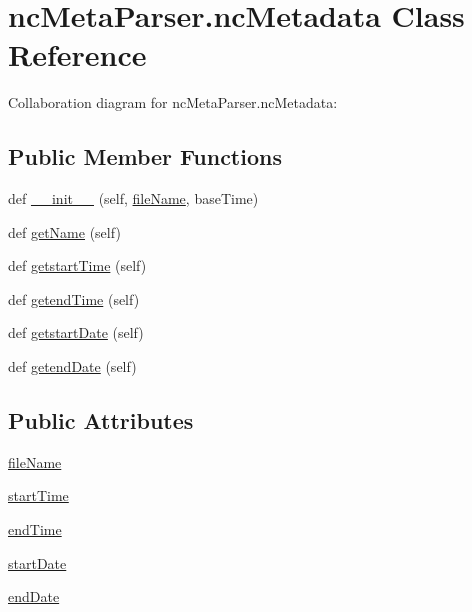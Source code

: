 \hypertarget{classnc_meta_parser_1_1nc_metadata}{}\section{nc\+Meta\+Parser.\+nc\+Metadata Class Reference}
\label{classnc_meta_parser_1_1nc_metadata}


Collaboration diagram for nc\+Meta\+Parser.\+nc\+Metadata\+:
\subsection*{Public Member Functions}
\begin{DoxyCompactItemize}
\item 
def \mbox{\hyperlink{classnc_meta_parser_1_1nc_metadata_aa36a1deb53cfbaee8976287877fa20fb}{\+\_\+\+\_\+init\+\_\+\+\_\+}} (self, \mbox{\hyperlink{classnc_meta_parser_1_1nc_metadata_a119acc5dbb77f035d27533b6fbe4a8c1}{file\+Name}}, base\+Time)
\item 
def \mbox{\hyperlink{classnc_meta_parser_1_1nc_metadata_ac262e3bca9dc97d7d55056a1931e6d1e}{get\+Name}} (self)
\item 
def \mbox{\hyperlink{classnc_meta_parser_1_1nc_metadata_afe2e767476347158c9359cc8c5afef21}{getstart\+Time}} (self)
\item 
def \mbox{\hyperlink{classnc_meta_parser_1_1nc_metadata_ad41081000ceb1f7aa122d5e4a1b674e4}{getend\+Time}} (self)
\item 
def \mbox{\hyperlink{classnc_meta_parser_1_1nc_metadata_a79b7ca324dcadb2f56066db1c663794a}{getstart\+Date}} (self)
\item 
def \mbox{\hyperlink{classnc_meta_parser_1_1nc_metadata_aea9c594ebe892b650ef724bdb73820e4}{getend\+Date}} (self)
\end{DoxyCompactItemize}
\subsection*{Public Attributes}
\begin{DoxyCompactItemize}
\item 
\mbox{\hyperlink{classnc_meta_parser_1_1nc_metadata_a119acc5dbb77f035d27533b6fbe4a8c1}{file\+Name}}
\item 
\mbox{\hyperlink{classnc_meta_parser_1_1nc_metadata_a52732ba284ca71b97931e928235fd36d}{start\+Time}}
\item 
\mbox{\hyperlink{classnc_meta_parser_1_1nc_metadata_ad84ec881e775ad4d096d41bd02847200}{end\+Time}}
\item 
\mbox{\hyperlink{classnc_meta_parser_1_1nc_metadata_abd8cbd92387417d12f948203e93c0946}{start\+Date}}
\item 
\mbox{\hyperlink{classnc_meta_parser_1_1nc_metadata_a846e0f0facf648d895d69b869a6e1fb0}{end\+Date}}
\end{DoxyCompactItemize}


